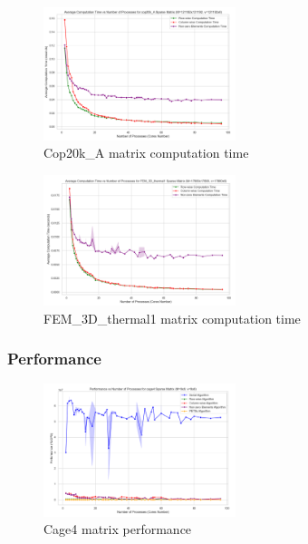 \documentclass[12pt,oneside]{book} %
\begin{document}
\begin{figure}[H]
    \centering
    \includegraphics[width=0.5\textwidth]{../results/matrix_dim/cop20k_A_k6_computation_time.png}
    \caption{Cop20k\_A matrix computation time}\label{fig:cop20k-a-k6-computation-tim-1}
\end{figure}

\begin{figure}[H]
    \centering
    \includegraphics[width=0.5\textwidth]{../results/matrix_dim/FEM_3D_thermal1_k6_computation_time.png}
    \caption{FEM\_3D\_thermal1 matrix computation time}\label{fig:fem-3d-thermal1-k6-computation-time}
\end{figure}

\subsubsection{Performance}

\begin{figure}[H]
    \centering
    \includegraphics[width=0.5\textwidth]{../results/matrix_dim/cage4_k6_performance.png}
    \caption{Cage4 matrix performance}\label{fig:cage4-k6-performance}
\end{figure}
\end{document}
